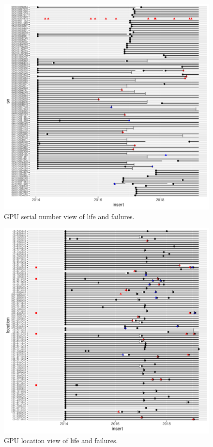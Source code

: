 \begin{figure}[ht]
  \includegraphics[width=6in]{sn.pdf}
  \caption{GPU serial number view of life and failures.}
\end{figure}



\begin{figure}[ht]
  \includegraphics[width=6in]{location.pdf}
  \caption{GPU location view of life and failures.}
\end{figure}


